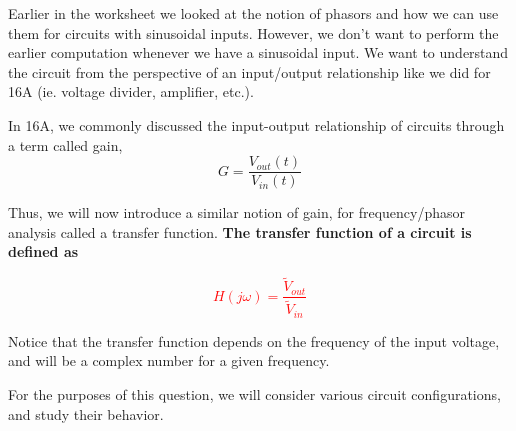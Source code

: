 

Earlier in the worksheet we looked at the notion of phasors and how we can use them for circuits with sinusoidal inputs.
However, we don't want to perform the earlier computation whenever we have a sinusoidal input.
We want to understand the circuit from the perspective of an input/output relationship like we did for 16A (ie. voltage divider, amplifier, etc.).

In 16A, we commonly discussed the input-output relationship of circuits through a term called gain,
\begin{equation}
G = \frac{V_{out}(t)}{V_{in}(t)}
\end{equation}

Thus, we will now introduce a similar notion of gain, for frequency/phasor analysis called a transfer function.
\textbf{
The transfer function of a circuit is defined as
}

\textcolor{red}{
\begin{equation}
H(j \omega) = \frac{\widetilde{V}_{out}}{\widetilde{V}_{in}}
\end{equation}
}

Notice that the transfer function depends on the frequency of the input voltage, and will be a complex number for a given frequency.

For the purposes of this question, we will consider various circuit configurations, and study their behavior.

%


